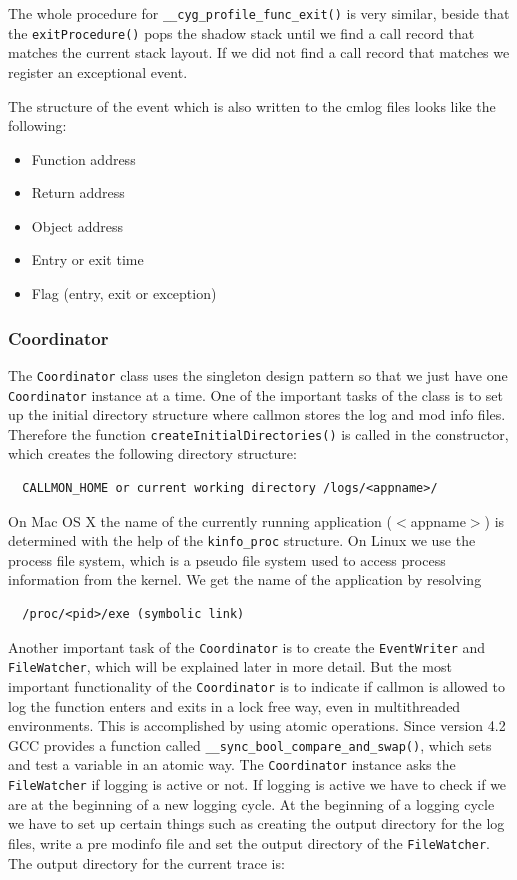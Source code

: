 The whole procedure for \verb=__cyg_profile_func_exit()= is very similar, beside that the \verb=exitProcedure()= pops the shadow stack until we find a call record that matches the current stack layout. If we did not find a call record that matches we register an exceptional event.

The structure of the event which is also written to the cmlog files looks like the following:
\begin{itemize}
	\item Function address
	\item Return address
	\item Object address
	\item Entry or exit time
	\item Flag (entry, exit or exception)
\end{itemize}

\subsubsection{Coordinator}

The \verb=Coordinator= class uses the singleton design pattern so that we just have one \verb=Coordinator= instance at a time. One of the important tasks of the class is to set up the initial directory structure where callmon stores the log and mod info files. Therefore the function \verb=createInitialDirectories()= is called in the constructor, which creates the following directory structure:

\begin{verbatim}
  CALLMON_HOME or current working directory /logs/<appname>/
\end{verbatim}

On Mac OS X the name of the currently running application ($<$appname$>$) is determined with the help of the \verb=kinfo_proc= structure. On Linux we use the process file system, which is a pseudo file system used to access process information from the kernel. We get the name of the application by resolving 

\begin{verbatim}
  /proc/<pid>/exe (symbolic link)
\end{verbatim}

Another important task of the \verb=Coordinator= is to create the \verb=EventWriter= and \verb=FileWatcher=, which will be explained later in more detail. But the most important functionality of the \verb=Coordinator= is to indicate if callmon is allowed to log the function enters and exits in a lock free way, even in multithreaded environments. This is accomplished by using atomic operations. Since version 4.2 GCC provides a function called \verb=__sync_bool_compare_and_swap()=, which sets and test a variable in an atomic way. The \verb=Coordinator= instance asks the \verb=FileWatcher= if logging is active or not. If logging is active we have to check if we are at the beginning of a new logging cycle. At the beginning of a logging cycle we have to set up certain things such as creating the output directory for the log files, write a pre modinfo file and set the output directory of the \verb=FileWatcher=. The output directory for the current trace is:

